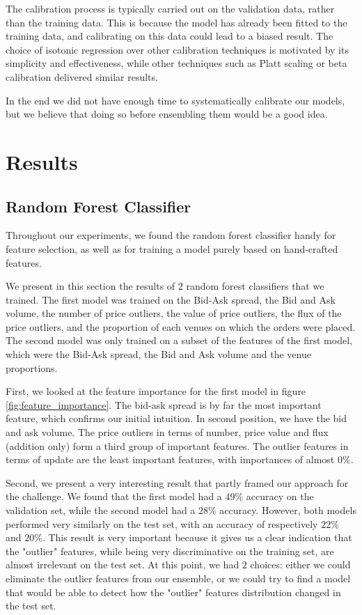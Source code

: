 \documentclass[switch, 11pt]{article}
\begin{document}
\begin{multicols}{2}
    The calibration process is typically carried out on the validation data, rather than the training data. This is because the model has already been fitted to the training data, and calibrating on this data could lead to a biased result. The choice of isotonic regression over other calibration techniques is motivated by its simplicity and effectiveness, while other techniques such as Platt scaling or beta calibration delivered similar results.

    In the end we did not have enough time to systematically calibrate our models, but we believe that doing so before ensembling them would be a good idea.

    \section{Results}

    \subsection{Random Forest Classifier}
    Throughout our experiments, we found the random forest classifier handy for feature selection, as well as for training a model purely based on hand-crafted features.

    We present in this section the results of $2$ random forest classifiers that we trained. The first model was trained on the Bid-Ask spread, the Bid and Ask volume, the number of price outliers, the value of price outliers, the flux of the price outliers, and the proportion of each venues on which the orders were placed. The second model was only trained on a subset of the features of the first model, which were the Bid-Ask spread, the Bid and Ask volume and the venue proportions.

    First, we looked at the feature importance for the first model in figure \ref{fig:feature_importance}. The bid-ask spread is by far the most important feature, which confirms our initial intuition. In second position, we have the bid and ask volume. The price outliers in terms of number, price value and flux (addition only) form a third group of important features. The outlier features in terms of update are the least important features, with importances of almost $0\%$.

    Second, we present a very interesting result that partly framed our approach for the challenge. We found that the first model had a $49\%$ accuracy on the validation set, while the second model had a $28\%$ accuracy. However, both models performed very similarly on the test set, with an accuracy of respectively $22\%$ and $20\%$. This result is very important because it gives us a clear indication that the "outlier" features, while being very discriminative on the training set, are almost irrelevant on the test set. At this point, we had $2$ choices: either we could eliminate the outlier features from our ensemble, or we could try to find a model that would be able to detect how the "outlier" features distribution changed in the test set.


\end{multicols}
\end{document}
